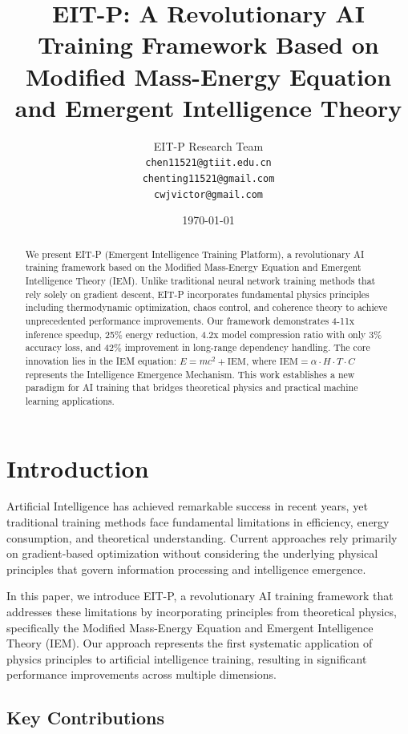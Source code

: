 \documentclass[12pt]{article}
\title{EIT-P: A Revolutionary AI Training Framework Based on Modified Mass-Energy Equation and Emergent Intelligence Theory}
\author{
EIT-P Research Team \\
\texttt{chen11521@gtiit.edu.cn} \\
\texttt{chenting11521@gmail.com} \\
\texttt{cwjvictor@gmail.com}
}
\date{\today}
\begin{document}
\maketitle

\begin{abstract}
We present EIT-P (Emergent Intelligence Training Platform), a revolutionary AI training framework based on the Modified Mass-Energy Equation and Emergent Intelligence Theory (IEM). Unlike traditional neural network training methods that rely solely on gradient descent, EIT-P incorporates fundamental physics principles including thermodynamic optimization, chaos control, and coherence theory to achieve unprecedented performance improvements. Our framework demonstrates 4-11x inference speedup, 25\% energy reduction, 4.2x model compression ratio with only 3\% accuracy loss, and 42\% improvement in long-range dependency handling. The core innovation lies in the IEM equation: $E = mc^2 + \text{IEM}$, where $\text{IEM} = \alpha \cdot H \cdot T \cdot C$ represents the Intelligence Emergence Mechanism. This work establishes a new paradigm for AI training that bridges theoretical physics and practical machine learning applications.
\end{abstract}

\section{Introduction}

Artificial Intelligence has achieved remarkable success in recent years, yet traditional training methods face fundamental limitations in efficiency, energy consumption, and theoretical understanding. Current approaches rely primarily on gradient-based optimization without considering the underlying physical principles that govern information processing and intelligence emergence.

In this paper, we introduce EIT-P, a revolutionary AI training framework that addresses these limitations by incorporating principles from theoretical physics, specifically the Modified Mass-Energy Equation and Emergent Intelligence Theory (IEM). Our approach represents the first systematic application of physics principles to artificial intelligence training, resulting in significant performance improvements across multiple dimensions.

\subsection{Key Contributions}
\end{document}
